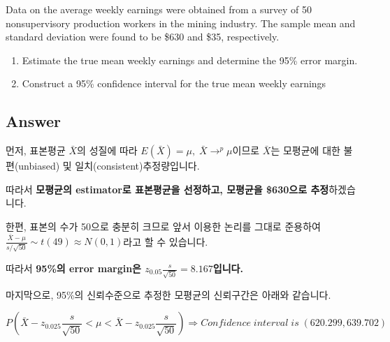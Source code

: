 \documentclass[
  letterpaper,
  DIV=11,
  numbers=noendperiod]{scrreprt}
\providecommand{\tightlist}{%
  \setlength{\itemsep}{0pt}\setlength{\parskip}{0pt}}\usepackage{longtable,booktabs,array}
\begin{document}

Data on the average weekly earnings were obtained from a survey of 50
nonsupervisory production workers in the mining industry. The sample
mean and standard deviation were found to be \$630 and \$35,
respectively.

\begin{enumerate}
\def\labelenumi{(\alph{enumi})}
\tightlist
\item
  Estimate the true mean weekly earnings and determine the 95\% error
  margin.
\item
  Construct a 95\% confidence interval for the true mean weekly earnings
\end{enumerate}

\subsection*{Answer}\label{answer-16}

먼저, 표본평균 \(\bar{X}\)의 성질에 따라
\(E(\bar{X})=\mu,\;\bar{X}\rightarrow^p \mu\)이므로 \(\bar{X}\)는
모평균에 대한 불편(unbiased) 및 일치(consistent)추정량입니다.

따라서 \textbf{모평균의 estimator로 표본평균을 선정하고, 모평균을
\$630으로 추정}하겠습니다.

한편, 표본의 수가 50으로 충분히 크므로 앞서 이용한 논리를 그대로
준용하여 \(\frac{\bar{X}-\mu}{s/\sqrt{50}}\sim t(49)\approx N(0,1)\)라고
할 수 있습니다.

따라서 \textbf{95\%의 error margin은
\(z_{0.05}\frac{s}{\sqrt{50}}=8.167\)입니다.}

마지막으로, 95\%의 신뢰수준으로 추정한 모평균의 신뢰구간은 아래와
같습니다.

\[P(\bar{X}-z_{0.025}\frac{s}{\sqrt{50}}<\mu<\bar{X}-z_{0.025}\frac{s}{\sqrt{50}})\Rightarrow Confidence\;interval\;is\;(620.299,639.702)\]
\end{document}
